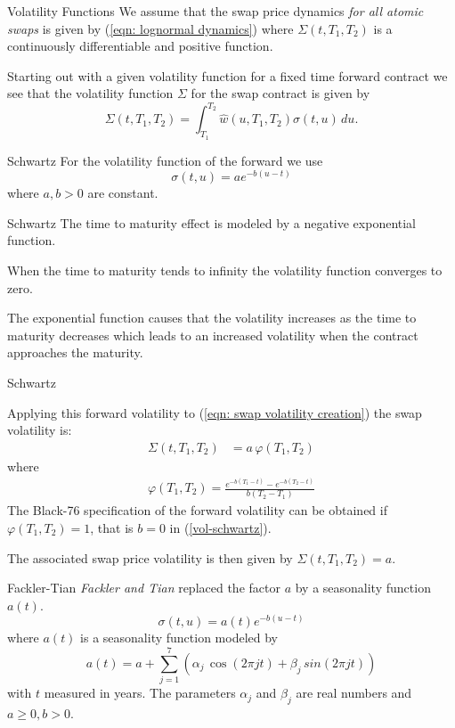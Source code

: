 {Volatility Functions}
We assume that the swap price dynamics \emph{for all atomic swaps} is given by (\ref{eqn: lognormal dynamics})
where $\Sigma(t,T_1,T_2)$ is a continuously differentiable and positive function.

Starting out with a given volatility function for a fixed time forward contract we see that the volatility function $\Sigma$ for the swap contract is given by
\begin{equation}
\Sigma(t,T_1,T_2)=\int_{T_1}^{T_2} \hat{w}(u,T_1,T_2) \sigma(t,u) \, du. \label{eqn: swap volatility creation}
\end{equation}

{Schwartz}
For the volatility function of the forward we use
\begin{equation}\label{vol-schwartz}
\sigma(t,u)=a e^{-b(u-t)}
\end{equation}
where $a,b >0 $ are constant.

{Schwartz}
The time to maturity effect is modeled by a negative exponential function.
\item<1-> When the time to maturity tends to infinity the volatility function converges to zero.
\item<2-> The exponential function causes that the volatility increases as the time to maturity decreases which leads to an increased volatility when the contract approaches the maturity.

{Schwartz}

Applying this forward volatility to (\ref{eqn: swap volatility creation}) the swap volatility is:
\begin{align}
\Sigma(t,T_1,T_2)&=a\,\varphi(T_1,T_2)
\end{align}
where
\begin{align}
\varphi(T_1,T_2)= \frac{e^{-b(T_1-t)}-e^{-b(T_2-t)}}{b(T_2-T_1)}
\label{volatility function varphi}
\end{align}
The Black-76 specification of the forward volatility can be obtained if $\varphi(T_1,T_2) =1$, that is $b=0$
in (\ref{vol-schwartz}).

The associated swap price volatility is then given by $\Sigma(t,T_1,T_2)=a$.

{Fackler-Tian}
\emph{Fackler and Tian}  replaced the factor $a$ by a seasonality function $a(t)$.
\begin{equation}
\sigma(t,u) = a(t)e^{-b(u-t)}
\end{equation}
where $a(t)$ is a seasonality function modeled by
\begin{equation}
a(t)=a+\sum_{j=1}^{7}(\alpha_j\, \cos(2\pi jt)+ \beta_j \, sin(2\pi jt)) \label{seasonality function}
\end{equation}
with $t$  measured in years. The parameters $\alpha_j$ and $\beta_j$ are real numbers and $a \ge 0, b > 0$.

